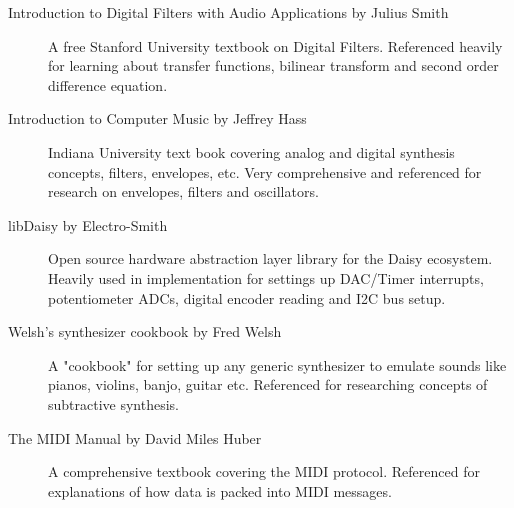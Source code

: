 \documentclass[acmlarge,screen]{acmart}
\begin{document}
\begin{description}
	\item[Introduction to Digital Filters with Audio Applications by Julius Smith] A free Stanford University textbook on Digital Filters. Referenced heavily for learning about transfer functions, bilinear transform and second order difference equation.
	\item[Introduction to Computer Music by Jeffrey Hass] Indiana University text book covering analog and digital synthesis concepts, filters, envelopes, etc. Very comprehensive and referenced for research on envelopes, filters and oscillators.
	\item[libDaisy by Electro-Smith] Open source hardware abstraction layer library for the Daisy ecosystem. Heavily used in implementation for settings up DAC/Timer interrupts, potentiometer ADCs, digital encoder reading and I2C bus setup.
	\item[Welsh's synthesizer cookbook by Fred Welsh] A "cookbook" for setting up any generic synthesizer to emulate sounds like pianos, violins, banjo, guitar etc. Referenced for researching concepts of subtractive synthesis.
	\item[The MIDI Manual by David Miles Huber] A comprehensive textbook covering the MIDI protocol. Referenced for explanations of how data is packed into MIDI messages.
\end{description}
\end{document}
